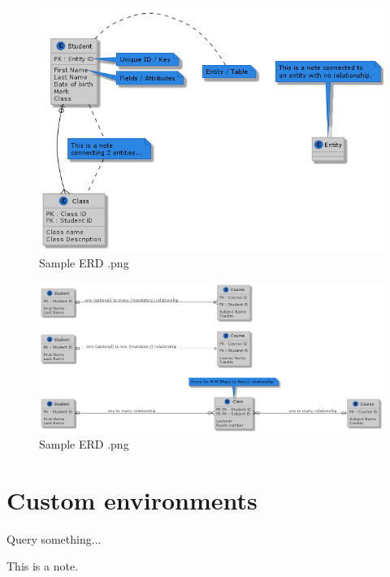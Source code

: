 {\begin{figure}[H]
  \includegraphics[width=500pt]{out/uml/SampleUML/SampleERD.png}
  \caption{Sample ERD .png}
  \label{fig:Sample ERD as .png}
\end{figure}

\begin{figure}[H]
  \includegraphics[width=500pt]{out/ERD_Sample_2.png}
  \caption{Sample ERD .png}
  \label{fig:Sample ERD as .png}
\end{figure}

\section{Custom environments}

\begin{followup}
  Query something...
\end{followup}

\begin{notes}
  This is a note.
\end{notes}

}
